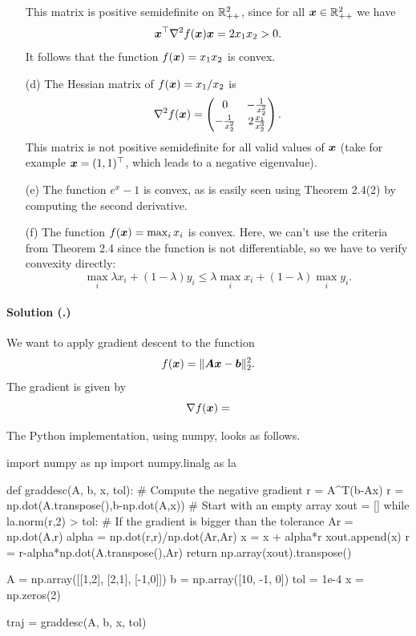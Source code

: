 \documentclass{article}
\newcounter{problemSheetNumber}
\newcounter{problems}
\renewcommand{\solution}[1]{\paragraph{Solution (\theproblemSheetNumber.\theproblems)}\addtocounter{problems}{1}\label{#1}}
\begin{document}
\begin{itemize}
This matrix is positive semidefinite on $\mathbb{R}^2_{++}$, since for all $\bm{x}\in \mathbb{R}^2_{++}$ we have
\begin{equation*}
 \bm{x}^{\top}\nabla^2f(\bm{x})\bm{x} = 2x_1x_2>0.
\end{equation*}
It follows that the function $f(\bm{x})=x_1x_2$ is convex.
\item[(d)] The Hessian matrix of $f(\bm{x})=x_1/x_2$ is 
\begin{equation*}
 \nabla^2f(\bm{x}) = \begin{pmatrix}
                       0 & -\frac{1}{x_2^2}\\
                       -\frac{1}{x_2^2} & 2\frac{x_1}{x_2^3}
                      \end{pmatrix}.
\end{equation*}
This matrix is not positive semidefinite for all valid values of $\bm{x}$ (take for example $\bm{x}=(1,1)^{\top}$, which leads to a negative eigenvalue).
\item[(e)] The function $e^x-1$ is convex, as is easily seen using Theorem 2.4(2) by computing the second derivative.
\item[(f)] The function $f(\bm{x})=\max_i x_i$ is convex. Here, we can't use the criteria from Theorem 2.4 since the function is not differentiable, so we have to verify convexity directly:
\begin{equation*}
 \max_i \lambda x_i+(1-\lambda)y_i \leq \lambda \max_i x_i+(1-\lambda) \max_i y_i.
\end{equation*}
 \end{itemize}

\solution{pr:3} We want to apply gradient descent to the function
\begin{equation*}
  f(\bm{x}) = \Vert {\bm{A}\bm{x}-\bm{b}}\Vert_2^2.
\end{equation*}
The gradient is given by
\begin{equation*}
  \nabla f(\bm{x}) = 
\end{equation*}

The Python implementation, using numpy, looks as follows.

\begin{ipythonnb}
import numpy as np
import numpy.linalg as la

def graddesc(A, b, x, tol):
    # Compute the negative gradient r = A^T(b-Ax)
    r = np.dot(A.transpose(),b-np.dot(A,x))
    # Start with an empty array
    xout = []
    while la.norm(r,2) > tol:
        # If the gradient is bigger than the tolerance
        Ar = np.dot(A,r)
        alpha = np.dot(r,r)/np.dot(Ar,Ar)
        x = x + alpha*r
        xout.append(x)
        r = r-alpha*np.dot(A.transpose(),Ar)
    return np.array(xout).transpose()
    
A = np.array([[1,2], [2,1], [-1,0]])
b = np.array([10, -1, 0])
tol = 1e-4
x = np.zeros(2)

traj = graddesc(A, b, x, tol)
\end{ipythonnb}
\end{document}
